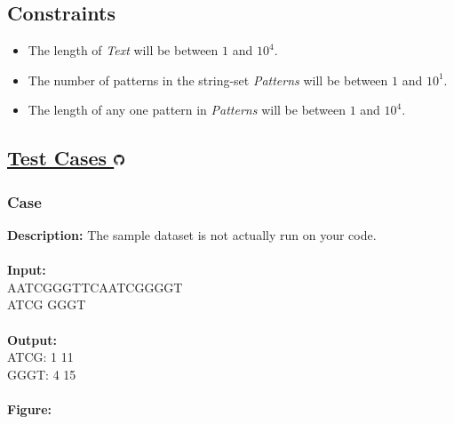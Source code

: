 \documentclass{article}
\newcommand{\code}[1]{{\fontfamily{pcr}\selectfont #1}}
\newcommand{\gitlogo}{\includegraphics[height=12.5]{c0/gitlogo.png}}
\begin{document}
\subsection*{Constraints}
\begin{itemize}
    \item The length of \emph{Text} will be between $1$ and $10^4$.
    \item The number of patterns in the string-set \emph{Patterns} will be between $1$ and $10^1$.
    \item The length of any one pattern in \emph{Patterns} will be between $1$ and $10^4$.
\end{itemize}
\pagebreak

\subsection*{\href{https://github.com/rjeveloff/BA_problemregister/tree/main/test_cases/chapter_9/9N}{Test Cases \gitlogo}}
\subsubsection*{Case }
\hline \vspace{5}
\textbf{Description:} The sample dataset is not actually run on your code.\\ \\
\noindent \textbf{Input:}\\
\code{AATCGGGTTCAATCGGGGT\\ ATCG GGGT}\\ \\
\noindent \textbf{Output:}\\
\code{ATCG: 1 11\\ GGGT: 4 15}\\ \\
\noindent \textbf{Figure:}
\end{document}
